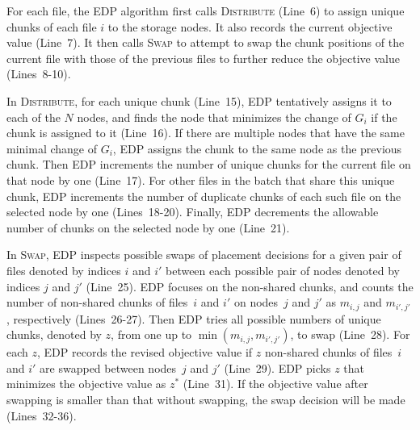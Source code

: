 For each file, the EDP algorithm first calls \textsc{Distribute} (Line~6) to
assign unique chunks of each file $i$ to the storage nodes.  It also records
the current objective value (Line~$7$).  It then calls \textsc{Swap} to
attempt to swap the chunk positions of the current file with those of the
previous files to further reduce the objective value (Lines~8-10).

In \textsc{Distribute}, for each unique chunk (Line~15), EDP tentatively
assigns it to each of the $N$ nodes, and finds the node that minimizes the
change of $G_i$ if the chunk is assigned to it (Line~16).  If there are
multiple nodes that have the same minimal change of $G_i$, EDP assigns the
chunk to the same node as the previous chunk.  Then EDP increments the number
of unique chunks for the current file on that node by one (Line~17).  For
other files in the batch that share this unique chunk, EDP increments the
number of duplicate chunks of each such file on the selected node by one
(Lines~18-20).  Finally, EDP decrements the allowable number of chunks 
on the selected node by one (Line~21).

In \textsc{Swap}, EDP inspects possible swaps of placement decisions for a
given pair of files denoted by indices $i$ and $i'$ between each possible pair
of nodes denoted by indices $j$ and $j'$ (Line~25).  EDP focuses on the
non-shared chunks, and counts the number of non-shared chunks of files~$i$ and
$i'$ on nodes~$j$ and $j'$ as $m_{i,j}$ and $m_{i',j'}$, respectively
(Lines~26-27).  Then EDP tries all possible numbers of unique chunks,
denoted by $z$, from one up to $\min(m_{i,j},m_{i',j'})$, to swap (Line~28).
For each $z$, EDP records the revised objective value if $z$ non-shared chunks
of files~$i$ and $i'$ are swapped between nodes~$j$ and $j'$ (Line~29).  EDP
picks $z$ that minimizes the objective value as $z^*$ (Line~31).  If the
objective value after swapping is smaller than that without swapping, the swap
decision will be made (Lines~32-36).

